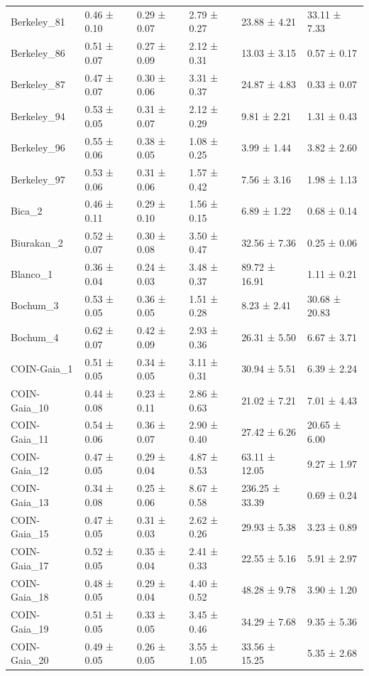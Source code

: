 \begin{tabular}{llllll}
Berkeley_81 & 0.46 ± 0.10 & 0.29 ± 0.07 & 2.79 ± 0.27 & 23.88 ± 4.21 & 33.11 ± 7.33 \\
Berkeley_86 & 0.51 ± 0.07 & 0.27 ± 0.09 & 2.12 ± 0.31 & 13.03 ± 3.15 & 0.57 ± 0.17 \\
Berkeley_87 & 0.47 ± 0.07 & 0.30 ± 0.06 & 3.31 ± 0.37 & 24.87 ± 4.83 & 0.33 ± 0.07 \\
Berkeley_94 & 0.53 ± 0.05 & 0.31 ± 0.07 & 2.12 ± 0.29 & 9.81 ± 2.21 & 1.31 ± 0.43 \\
Berkeley_96 & 0.55 ± 0.06 & 0.38 ± 0.05 & 1.08 ± 0.25 & 3.99 ± 1.44 & 3.82 ± 2.60 \\
Berkeley_97 & 0.53 ± 0.06 & 0.31 ± 0.06 & 1.57 ± 0.42 & 7.56 ± 3.16 & 1.98 ± 1.13 \\
Bica_2 & 0.46 ± 0.11 & 0.29 ± 0.10 & 1.56 ± 0.15 & 6.89 ± 1.22 & 0.68 ± 0.14 \\
Biurakan_2 & 0.52 ± 0.07 & 0.30 ± 0.08 & 3.50 ± 0.47 & 32.56 ± 7.36 & 0.25 ± 0.06 \\
Blanco_1 & 0.36 ± 0.04 & 0.24 ± 0.03 & 3.48 ± 0.37 & 89.72 ± 16.91 & 1.11 ± 0.21 \\
Bochum_3 & 0.53 ± 0.05 & 0.36 ± 0.05 & 1.51 ± 0.28 & 8.23 ± 2.41 & 30.68 ± 20.83 \\
Bochum_4 & 0.62 ± 0.07 & 0.42 ± 0.09 & 2.93 ± 0.36 & 26.31 ± 5.50 & 6.67 ± 3.71 \\
COIN-Gaia_1 & 0.51 ± 0.05 & 0.34 ± 0.05 & 3.11 ± 0.31 & 30.94 ± 5.51 & 6.39 ± 2.24 \\
COIN-Gaia_10 & 0.44 ± 0.08 & 0.23 ± 0.11 & 2.86 ± 0.63 & 21.02 ± 7.21 & 7.01 ± 4.43 \\
COIN-Gaia_11 & 0.54 ± 0.06 & 0.36 ± 0.07 & 2.90 ± 0.40 & 27.42 ± 6.26 & 20.65 ± 6.00 \\
COIN-Gaia_12 & 0.47 ± 0.05 & 0.29 ± 0.04 & 4.87 ± 0.53 & 63.11 ± 12.05 & 9.27 ± 1.97 \\
COIN-Gaia_13 & 0.34 ± 0.08 & 0.25 ± 0.06 & 8.67 ± 0.58 & 236.25 ± 33.39 & 0.69 ± 0.24 \\
COIN-Gaia_15 & 0.47 ± 0.05 & 0.31 ± 0.03 & 2.62 ± 0.26 & 29.93 ± 5.38 & 3.23 ± 0.89 \\
COIN-Gaia_17 & 0.52 ± 0.05 & 0.35 ± 0.04 & 2.41 ± 0.33 & 22.55 ± 5.16 & 5.91 ± 2.97 \\
COIN-Gaia_18 & 0.48 ± 0.05 & 0.29 ± 0.04 & 4.40 ± 0.52 & 48.28 ± 9.78 & 3.90 ± 1.20 \\
COIN-Gaia_19 & 0.51 ± 0.05 & 0.33 ± 0.05 & 3.45 ± 0.46 & 34.29 ± 7.68 & 9.35 ± 5.36 \\
COIN-Gaia_20 & 0.49 ± 0.05 & 0.26 ± 0.05 & 3.55 ± 1.05 & 33.56 ± 15.25 & 5.35 ± 2.68 \\

\end{tabular}
